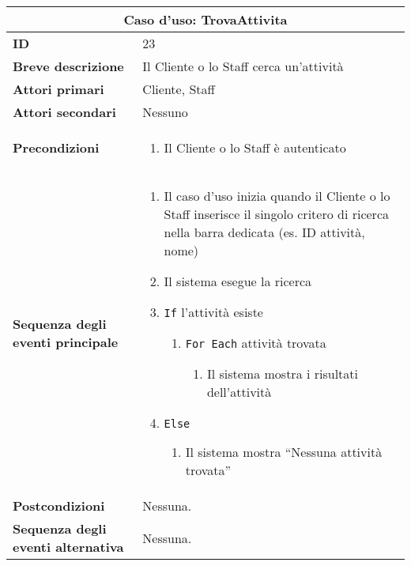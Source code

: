 \documentclass[a4paper]{report}
\begin{document}
\clearpage
\begin{table}[H]
\vspace*{-0cm}
\renewcommand{\arraystretch}{1.9}
\begin{tabular}{|p{3.9cm}|p{9.9cm}|}
\hline
\multicolumn{2}{|c|}{\textbf{Caso d’uso: TrovaAttivita}} \\ \hline
	\textbf{ID} & 23 \\ \hline
	\textbf{Breve descrizione} & Il Cliente o lo Staff cerca un’attività \\ \hline
	\textbf{Attori primari} & Cliente, Staff \\ \hline
	\textbf{Attori secondari} & Nessuno \\ \hline
	\textbf{Precondizioni} & \begin{enumerate}[leftmargin=14pt,label=\arabic*.,labelsep=0.5em,topsep=0pt,partopsep=0pt,parsep=0pt,itemsep=0pt]
    \item Il Cliente o lo Staff è autenticato
\end{enumerate} \\ \hline
	\textbf{Sequenza degli eventi principale} & \begin{enumerate}[leftmargin=14pt,label=\arabic*.,labelsep=0.5em,topsep=0pt,partopsep=0pt,parsep=0pt,itemsep=0pt]
    \item Il caso d’uso inizia quando il Cliente o lo Staff inserisce il singolo critero di ricerca nella barra dedicata (es. ID attività, nome)
    \item Il sistema esegue la ricerca
    \item \texttt{If} l’attività esiste
    \begin{enumerate}[label=\arabic{enumi}.\arabic*.,leftmargin=22pt,labelsep=0.5em,topsep=0pt,partopsep=0pt,parsep=0pt,itemsep=0pt]
        \item \texttt{For Each} attività trovata
        \begin{enumerate}[label=\arabic{enumi}.\arabic{enumii}.\arabic*.,leftmargin=22pt,labelsep=0.5em,topsep=0pt,partopsep=0pt,parsep=0pt,itemsep=0pt]
            \item Il sistema mostra i risultati dell'attività
        \end{enumerate}
    \end{enumerate}
    \item \texttt{Else}
    \begin{enumerate}[label=\arabic{enumi}.\arabic*.,leftmargin=22pt,labelsep=0.5em,topsep=0pt,partopsep=0pt,parsep=0pt,itemsep=0pt]
        \item Il sistema mostra “Nessuna attività trovata”
    \end{enumerate}
\end{enumerate} \\ \hline
	\textbf{Postcondizioni} & Nessuna. \\ \hline
	\textbf{Sequenza degli eventi alternativa} & Nessuna. \\ \hline
\end{tabular}
\end{table}
\end{document}
